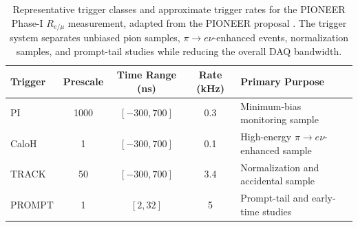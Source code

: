 \begin{table}[htbp]
  \centering
  \caption{
    Representative trigger classes and approximate trigger rates for the
    PIONEER Phase-I \(R_{e/\mu}\) measurement, adapted from the PIONEER
    proposal \cite{pioneer_proposal_2022}. The trigger system separates
    unbiased pion samples, \(\pi\to e\nu\)-enhanced events, normalization
    samples, and prompt-tail studies while reducing the overall DAQ bandwidth.
  }
  \label{tab:pioneer-trigger-rates}
  \small
  \begin{tabular}{@{}lcccp{}@{}}
    \toprule
    Trigger & Prescale & Time Range (ns) & Rate (kHz) & Primary Purpose \\
    \midrule
    PI      & 1000 & $[-300,700]$ & 0.3 & Minimum-bias monitoring sample \\
    CaloH   & 1    & $[-300,700]$ & 0.1 & High-energy \(\pi\to e\nu\)-enhanced sample \\
    TRACK   & 50   & $[-300,700]$ & 3.4 & Normalization and accidental sample \\
    PROMPT  & 1    & $[2,32]$     & 5   & Prompt-tail and early-time studies \\
    \bottomrule
  \end{tabular}
\end{table}
